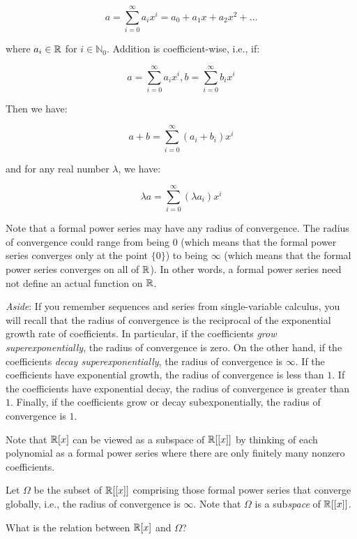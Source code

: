 \documentclass[10pt]{amsart}
\begin{document}
\begin{enumerate}
  $$a = \sum_{i=0}^\infty a_ix^i = a_0 + a_1x + a_2x^2 + \dots$$

  where $a_i \in \mathbb{R}$ for $i \in \mathbb{N}_0$. Addition is
  coefficient-wise, i.e., if:

  $$a = \sum_{i=0}^\infty a_ix^i, b = \sum_{i=0}^\infty b_ix^i$$

  Then we have:

  $$a + b = \sum_{i=0}^\infty (a_i + b_i)x^i$$

  and for any real number $\lambda$, we have:

  $$\lambda a = \sum_{i=0}^\infty (\lambda a_i)x^i$$

  Note that a formal power series may have any radius of
  convergence. The radius of convergence could range from being $0$
  (which means that the formal power series converges only at the
  point $\{ 0 \}$) to being $\infty$ (which means that the formal
  power series converges on all of $\mathbb{R}$). In other words, a formal
  power series need not define an actual function on $\mathbb{R}$.

  {\em Aside}: If you remember sequences and series from
  single-variable calculus, you will recall that the radius of
  convergence is the reciprocal of the exponential growth rate of
  coefficients. In particular, if the coefficients {\em grow
    superexponentially}, the radius of convergence is zero. On the
  other hand, if the coefficients {\em decay superexponentially}, the
  radius of convergence is $\infty$. If the coefficients have
  exponential growth, the radius of convergence is less than $1$. If
  the coefficients have exponential decay, the radius of convergence
  is greater than $1$. Finally, if the coefficients grow or decay
  subexponentially, the radius of convergence is $1$.

  Note that $\mathbb{R}[x]$ can be viewed as a subspace of $\mathbb{R}[[x]]$ by
  thinking of each polynomial as a formal power series where there are
  only finitely many nonzero coefficients.

  Let $\Omega$ be the subset of $\mathbb{R}[[x]]$ comprising those formal power
  series that converge globally, i.e., the radius of convergence is
  $\infty$. Note that $\Omega$ is a sub{\em space} of $\mathbb{R}[[x]]$.

  What is the relation between $\mathbb{R}[x]$ and $\Omega$?


\end{enumerate}
\end{document}
